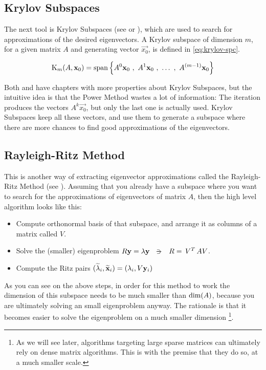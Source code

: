\subsection{Krylov Subspaces}

The next tool is Krylov Subspaces (see \cite{parlett80} or
\cite{saad92}), which are used to search for 
approximations of the desired eigenvectors. A Krylov subspace of
dimension $m$, for a given matrix $A$ and generating vector
$\vec{x_0}$, is defined in \cref{eq:krylov-spc}.

\begin{equation}
  \label{eq:krylov-spc}
    \Krylov{A}{\vec{x}_0}{m} =
    \func{span}
    \left\{
      A^0\vec{x}_0\ds{,} A^1\vec{x}_0\ds{,} \ldots \ds{,}  A^{(m-1)}\vec{x}_0
      \right\}  
\end{equation}
\joinbelow{1cm}

Both \cite{parlett80} and \cite{saad92} have chapters with more
properties about Krylov Subspaces, but the intuitive idea is that the
Power Method wastes a lot of information: The iteration
produces the vectors $A^k\vec{x_0}$, but only the last one is actually
used. Krylov Subspaces keep all these vectors, and use them to
generate a subspace where there are more chances to find good
approximations of the eigenvectors.

\subsection{Rayleigh-Ritz Method}

This is another way of extracting eigenvector approximations called
the Rayleigh-Ritz Method (see \cite{saad92}). Assuming
that you 
already have a subspace where you want to search for the
approximations of eigenvectors of matrix $A$, then the high level
algorithm looks like this: 

\begin{itemize}
  \item Compute orthonormal basis of that subspace, and arrange it as
    columns of a matrix called $V$.
  \item Solve the (smaller) eigenproblem $R\vec{y} = \lambda\vec{y}
    \ds{\suchthat} R = \trans{V} A V$. 
  \item Compute the Ritz pairs
      $(\widetilde{\lambda}_i,\widetilde{\mathbf{x}}_i) = (\lambda_i, V\mathbf{y}_i)$
\end{itemize}

As you can see on the above steps, in order for this method to work
the dimension of this subspace  needs to be much smaller than
$\operatorname{dim}(A)$, because you are ultimately solving an small
eigenproblem anyway.  The rationale is that it becomes easier to
solve the eigenproblem on a much smaller dimension \footnote{As we
  will see later, algorithms targeting large sparse matrices can
  ultimately rely on dense matrix algorithms. This is with the premise that
  they do so, at a much smaller scale.}. \\

